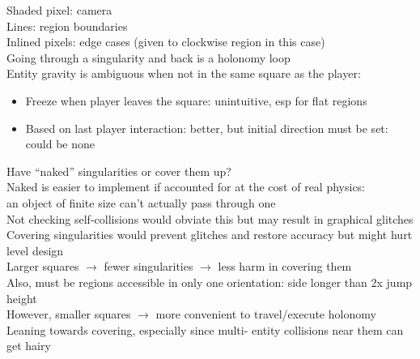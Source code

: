 \documentclass{article}
\begin{document}
Shaded pixel: camera \\
Lines: region boundaries \\
Inlined pixels: edge cases (given to clockwise region in this case) \\
Going through a singularity and back is a holonomy loop \\
Entity gravity is ambiguous when not in the same square as the player:
\begin{itemize}
\item
  Freeze when player leaves the square: unintuitive, esp for flat regions
\item
  Based on last player interaction: better, but initial direction must be set:
  could be none
\end{itemize}
Have ``naked'' singularities or cover them up? \\
Naked is easier to implement if accounted for
at the cost of real physics: \\
an object of finite size can't actually pass through one \\
Not checking self-collisions would obviate this
but may result in graphical glitches \\
Covering singularities would prevent glitches and restore accuracy
but might hurt level design \\
Larger squares $\rightarrow$ fewer singularities $\rightarrow$ less harm in covering them \\
Also, must be regions  accessible in only one orientation:
side longer than 2x jump height \\
However, smaller squares $\rightarrow$ more convenient to travel/execute holonomy \\
Leaning towards covering,
especially since multi- entity collisions near them can get hairy \\

\end{document}
